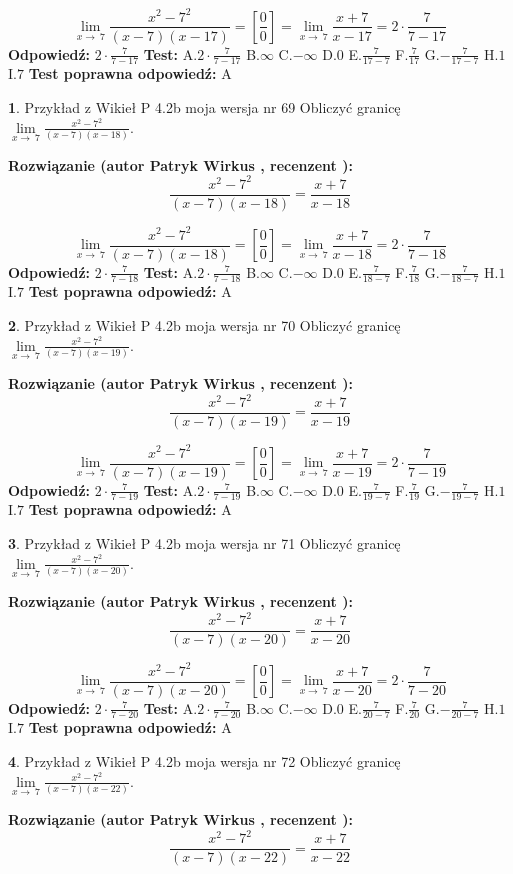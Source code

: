 \documentclass[12pt, a4paper]{article}
\theoremstyle{definition} %
\newtheorem{zad}{}
\newcommand{\zadStart}[1]{\begin{zad}#1\newline}
\newcommand{\zadStop}{\end{zad}}
\newcommand{\rozwStart}[2]{\noindent \textbf{Rozwiązanie (autor #1 , recenzent #2): }\newline}
\newcommand{\rozwStop}{\newline}
\newcommand{\odpStart}{\noindent \textbf{Odpowiedź:}\newline}
\newcommand{\odpStop}{\newline}
\newcommand{\testStart}{\noindent \textbf{Test:}\newline}
\newcommand{\testStop}{\newline}
\newcommand{\kluczStart}{\noindent \textbf{Test poprawna odpowiedź:}\newline}
\newcommand{\kluczStop}{\newline}
\begin{document}
$$\lim\limits_{x\to\ 7}\frac{x^{2}-7^{2}}{(x-7)(x-17)}=[\frac{0}{0}]=\lim\limits_{x\to\ 7}\frac{x+7}{x-17}=2 \cdot \frac{7}{7-17}$$
\rozwStop
\odpStart
$2 \cdot \frac{7}{7-17}$
\odpStop
\testStart
A.$2 \cdot \frac{7}{7-17}$
B.$\infty$
C.$-\infty$
D.$0$
E.$\frac{7}{17-7}$
F.$\frac{7}{17}$
G.$-\frac{7}{17-7}$
H.$1$
I.$7$
\testStop
\kluczStart
A
\kluczStop



\zadStart{Przykład z Wikieł P 4.2b moja wersja nr 69}
Obliczyć granicę $\lim\limits_{x\to\ 7}\frac{x^{2}-7^{2}}{(x-7)(x-18)}$.
\zadStop
\rozwStart{Patryk Wirkus}{}
$$\frac{x^{2}-7^{2}}{(x-7)(x-18)}=\frac{x+7}{x-18}$$

$$\lim\limits_{x\to\ 7}\frac{x^{2}-7^{2}}{(x-7)(x-18)}=[\frac{0}{0}]=\lim\limits_{x\to\ 7}\frac{x+7}{x-18}=2 \cdot \frac{7}{7-18}$$
\rozwStop
\odpStart
$2 \cdot \frac{7}{7-18}$
\odpStop
\testStart
A.$2 \cdot \frac{7}{7-18}$
B.$\infty$
C.$-\infty$
D.$0$
E.$\frac{7}{18-7}$
F.$\frac{7}{18}$
G.$-\frac{7}{18-7}$
H.$1$
I.$7$
\testStop
\kluczStart
A
\kluczStop



\zadStart{Przykład z Wikieł P 4.2b moja wersja nr 70}
Obliczyć granicę $\lim\limits_{x\to\ 7}\frac{x^{2}-7^{2}}{(x-7)(x-19)}$.
\zadStop
\rozwStart{Patryk Wirkus}{}
$$\frac{x^{2}-7^{2}}{(x-7)(x-19)}=\frac{x+7}{x-19}$$

$$\lim\limits_{x\to\ 7}\frac{x^{2}-7^{2}}{(x-7)(x-19)}=[\frac{0}{0}]=\lim\limits_{x\to\ 7}\frac{x+7}{x-19}=2 \cdot \frac{7}{7-19}$$
\rozwStop
\odpStart
$2 \cdot \frac{7}{7-19}$
\odpStop
\testStart
A.$2 \cdot \frac{7}{7-19}$
B.$\infty$
C.$-\infty$
D.$0$
E.$\frac{7}{19-7}$
F.$\frac{7}{19}$
G.$-\frac{7}{19-7}$
H.$1$
I.$7$
\testStop
\kluczStart
A
\kluczStop



\zadStart{Przykład z Wikieł P 4.2b moja wersja nr 71}
Obliczyć granicę $\lim\limits_{x\to\ 7}\frac{x^{2}-7^{2}}{(x-7)(x-20)}$.
\zadStop
\rozwStart{Patryk Wirkus}{}
$$\frac{x^{2}-7^{2}}{(x-7)(x-20)}=\frac{x+7}{x-20}$$

$$\lim\limits_{x\to\ 7}\frac{x^{2}-7^{2}}{(x-7)(x-20)}=[\frac{0}{0}]=\lim\limits_{x\to\ 7}\frac{x+7}{x-20}=2 \cdot \frac{7}{7-20}$$
\rozwStop
\odpStart
$2 \cdot \frac{7}{7-20}$
\odpStop
\testStart
A.$2 \cdot \frac{7}{7-20}$
B.$\infty$
C.$-\infty$
D.$0$
E.$\frac{7}{20-7}$
F.$\frac{7}{20}$
G.$-\frac{7}{20-7}$
H.$1$
I.$7$
\testStop
\kluczStart
A
\kluczStop



\zadStart{Przykład z Wikieł P 4.2b moja wersja nr 72}
Obliczyć granicę $\lim\limits_{x\to\ 7}\frac{x^{2}-7^{2}}{(x-7)(x-22)}$.
\zadStop
\rozwStart{Patryk Wirkus}{}
$$\frac{x^{2}-7^{2}}{(x-7)(x-22)}=\frac{x+7}{x-22}$$
\end{document}
